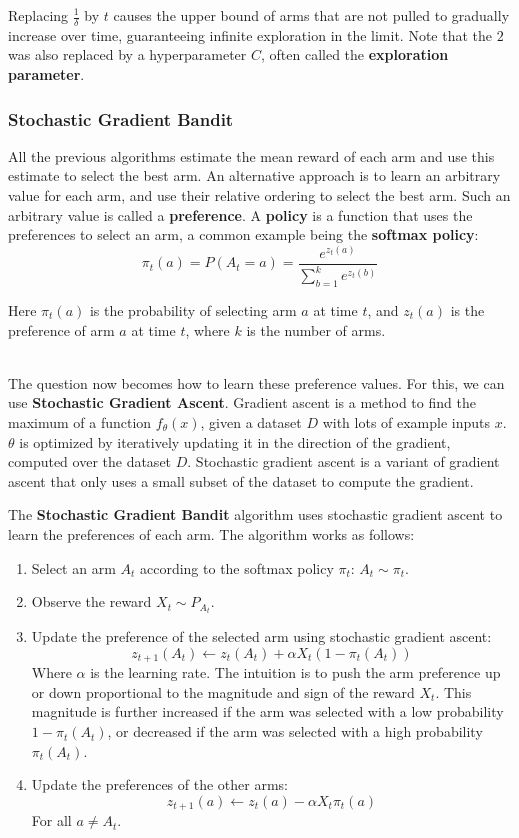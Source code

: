 \documentclass[12pt]{article}
\begin{document}
\noindent
Replacing $\frac{1}{\delta}$ by $t$ causes the upper bound of arms that are not pulled to gradually increase over time, guaranteeing infinite exploration in the limit.
Note that the $2$ was also replaced by a hyperparameter $C$, often called the \textbf{exploration parameter}.

\subsubsection{Stochastic Gradient Bandit}
All the previous algorithms estimate the mean reward of each arm and use this estimate to select the best arm.
An alternative approach is to learn an arbitrary value for each arm, and use their relative ordering to select the best arm.
Such an arbitrary value is called a \textbf{preference}.
A \textbf{policy} is a function that uses the preferences to select an arm, a common example being the \textbf{softmax policy}:
\[ \pi_t(a) = P(A_t = a) = \frac{e^{z_t(a)}}{\displaystyle \sum_{b = 1}^k e^{z_t(b)}} \]

\noindent
Here $\pi_t(a)$ is the probability of selecting arm $a$ at time $t$, and $z_t(a)$ is the preference of arm $a$ at time $t$, where $k$ is the number of arms.

\noindent
\\
The question now becomes how to learn these preference values.
For this, we can use \textbf{Stochastic Gradient Ascent}.
Gradient ascent is a method to find the maximum of a function $f_\theta(x)$, given a dataset $D$ with lots of example inputs $x$.
$\theta$ is optimized by iteratively updating it in the direction of the gradient, computed over the dataset $D$.
Stochastic gradient ascent is a variant of gradient ascent that only uses a small subset of the dataset to compute the gradient.

\newpage
\noindent
The \textbf{Stochastic Gradient Bandit} algorithm uses stochastic gradient ascent to learn the preferences of each arm.
The algorithm works as follows:

\begin{enumerate}
    \item Select an arm $A_t$ according to the softmax policy $\pi_t$: $A_t \sim \pi_t$.
    \item Observe the reward $X_t \sim P_{A_t}$.
    \item Update the preference of the selected arm using stochastic gradient ascent:
    \[ z_{t + 1}(A_t) \leftarrow z_t(A_t) + \alpha X_t (1 - \pi_t(A_t)) \]
    Where $\alpha$ is the learning rate. The intuition is to push the arm preference up or down proportional to the magnitude and sign of the reward $X_t$.
    This magnitude is further increased if the arm was selected with a low probability $1 - \pi_t(A_t)$, or decreased if the arm was selected with a high probability $\pi_t(A_t)$.
    \item Update the preferences of the other arms:
    \[ z_{t + 1}(a) \leftarrow z_t(a) - \alpha X_t \pi_t(a) \]
    For all $a \neq A_t$.
\end{enumerate}
\end{document}
